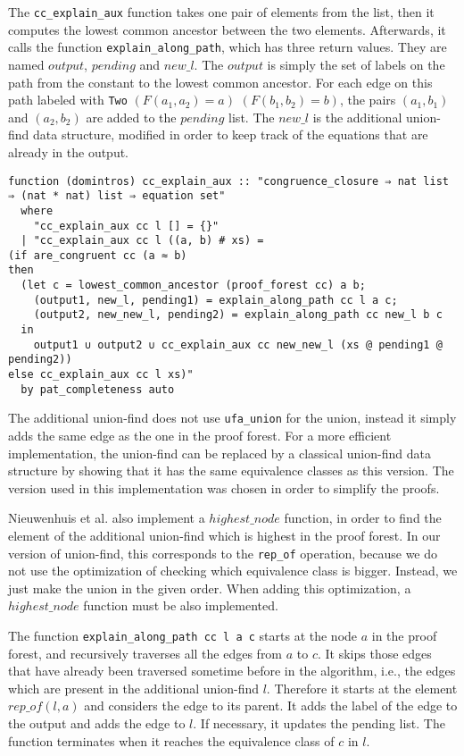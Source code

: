 The \lstinline{cc_explain_aux} function takes one pair of elements from the list, then it
computes the lowest common ancestor between the two elements.
Afterwards, it calls the function \lstinline{explain_along_path}, which has three return values. They are named $output$, $pending$ and $new\_l$.
The $output$ is simply the set of labels on the path from the constant to the lowest common ancestor. For each edge on this path labeled with \lstinline|Two| $(F(a_1, a_2) = a)$ $(F(b_1, b_2) = b)$, the pairs $(a_1, b_1)$ and $(a_2, b_2)$ are added to the $pending$ list. The $new\_l$ is the additional union-find data structure, modified in order to keep track of the equations that are already in the output.

\begin{lstlisting}
function (domintros) cc_explain_aux :: "congruence_closure ⇒ nat list ⇒ (nat * nat) list ⇒ equation set"
  where
    "cc_explain_aux cc l [] = {}"
  | "cc_explain_aux cc l ((a, b) # xs) =
(if are_congruent cc (a ≈ b)
then
  (let c = lowest_common_ancestor (proof_forest cc) a b;
    (output1, new_l, pending1) = explain_along_path cc l a c;
    (output2, new_new_l, pending2) = explain_along_path cc new_l b c
  in
    output1 ∪ output2 ∪ cc_explain_aux cc new_new_l (xs @ pending1 @ pending2))
else cc_explain_aux cc l xs)"
  by pat_completeness auto
\end{lstlisting}

The additional union-find does not use \lstinline{ufa_union} for the union, instead it simply adds the same edge as the one in the proof forest.
For a more efficient implementation, the union-find can be replaced by a classical union-find data structure by showing that it has the same equivalence classes as this version.
The version used in this implementation was chosen in order to simplify the proofs.

Nieuwenhuis et al. \cite{Nieuwenhuis} also implement a $highest\_node$ function, in order to find the element of the additional union-find which is highest in the proof forest.
In our version of union-find, this corresponds to the \lstinline{rep_of} operation, because we do not use the optimization of checking which equivalence class is bigger. Instead, we just make the union in the given order. When adding this optimization, a $highest\_node$ function must be also implemented.

The function \lstinline{explain_along_path cc l a c} starts at the node $a$ in the proof forest, and recursively traverses all the edges from $a$ to $c$. It skips those edges that have already been traversed sometime before in the algorithm, i.e., the edges which are present in the additional union-find $l$. Therefore it starts at the element $rep\_of(l, a)$ and considers the edge to its parent. It adds the label of the edge to the output and adds the edge to $l$. If necessary, it updates the pending list. The function terminates when it reaches the equivalence class of $c$ in $l$.

